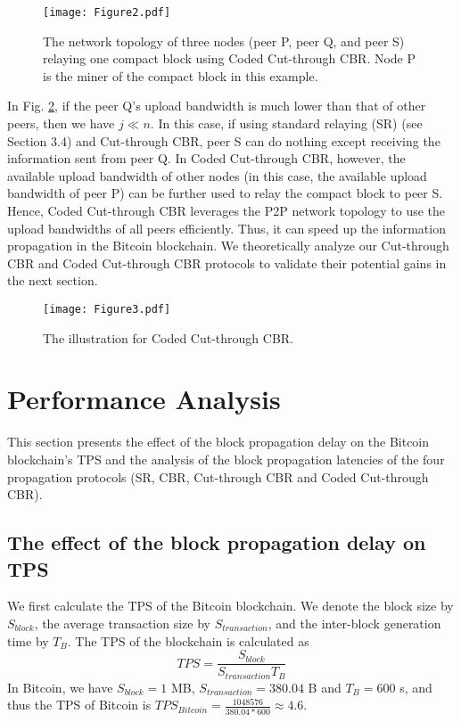 \documentclass[10pt,journal,compsoc]{IEEEtran}
\begin{document}
\begin{figure}[!t]
	\centering
	\texttt{[image: Figure2.pdf]}
	\caption{The network topology of three nodes (peer P, peer Q, and peer S) relaying one compact block using Coded Cut-through CBR. Node P is the miner of the compact block in this example.}
	\label{fig_2}
\end{figure}

In Fig. \ref{fig_3}, if the peer Q’s upload bandwidth is much lower than that of other peers, then we have $j \ll n$. In this case, if using standard relaying (SR) (see Section 3.4) and Cut-through CBR, peer S can do nothing except receiving the information sent from peer Q. In Coded Cut-through CBR, however, the available upload bandwidth of other nodes (in this case, the available upload bandwidth of peer P) can be further used to relay the compact block to peer S. Hence, Coded Cut-through CBR leverages the P2P network topology to use the upload bandwidths of all peers efficiently. Thus, it can speed up the information propagation in the Bitcoin blockchain. We theoretically analyze our Cut-through CBR and Coded Cut-through CBR protocols to validate their potential gains in the next section.

\begin{figure}[!t]
	\centering
	\texttt{[image: Figure3.pdf]}
	\caption{The illustration for Coded Cut-through CBR.}
	\label{fig_3}
\end{figure}

\section{Performance Analysis}
This section presents the effect of the block propagation delay on the Bitcoin blockchain's TPS and the analysis of the block propagation latencies of the four propagation protocols (SR, CBR, Cut-through CBR and Coded Cut-through CBR).
\label{section:analysis}
\subsection{The effect of the block propagation delay on TPS}
We first calculate the TPS of the Bitcoin blockchain. We denote the block size by ${S_{block}}$, the average transaction size by ${S_{transaction}}$, and the inter-block generation time by ${T_B}$. The TPS of the blockchain is calculated as  
\begin{equation}
	\label{eqn:TPSCal}
	TPS = \frac{{{S_{block}}}}{{{S_{transaction}}{T_B}}}
\end{equation}
In Bitcoin, we have ${S_{block}} = 1$ MB, ${S_{transaction}} = 380.04$ B and ${T_B} = 600$ s, and thus the TPS of Bitcoin is 
$TP{S_{Bitcoin}} = \frac{{1048576}}{{380.04*600}} \approx 4.6$. 
\end{document}
